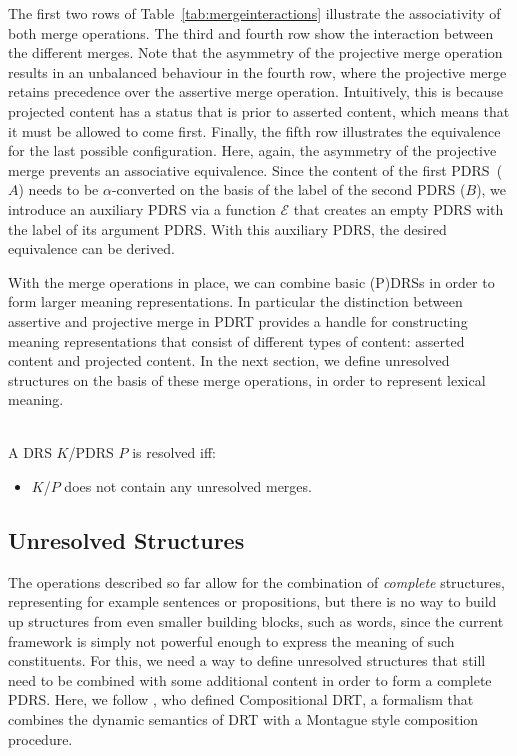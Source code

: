 \noindent The first two rows of Table~\ref{tab:mergeinteractions} illustrate
the associativity of both merge operations. The third and fourth row show
the interaction between the different merges. Note that the asymmetry of the
projective merge operation results in an unbalanced behaviour in the fourth
row, where the projective merge retains precedence over the assertive merge
operation. Intuitively, this is because projected content has a status that
is prior to asserted content, which means that it must be allowed to come
first.  Finally, the fifth row illustrates the equivalence for the last
possible configuration. Here, again, the asymmetry of the projective merge
prevents an associative equivalence. Since the content of the first
PDRS~($A$) needs to be $\alpha$-converted on the basis of the label of the
second PDRS ($B$), we introduce an auxiliary PDRS via a function
$\mathcal{E}$ that creates an empty PDRS with the label of its argument
PDRS. With this auxiliary PDRS, the desired equivalence can be derived.

With the merge operations in place, we can combine basic (P)DRSs in order to
form larger meaning representations. In particular the distinction between
assertive and projective merge in PDRT provides a handle for constructing
meaning representations that consist of different types of content: asserted
content and projected content. In the next section, we define unresolved
structures on the basis of these merge operations, in order to represent
lexical meaning.

\begin{definition}[Resolvedness]~\\
A DRS $K$/PDRS $P$ is resolved iff:
\begin{itemize}
  \item $K$/$P$ does not contain any unresolved merges.
\end{itemize}
\end{definition}

\subsection{Unresolved Structures}

The operations described so far allow for the combination of \emph{complete}
structures, representing for example sentences or propositions, but there is
no way to build up structures from even smaller building blocks, such as
words, since the current framework is simply not powerful enough to express
the meaning of such constituents. For this, we need a way to define
unresolved structures that still need to be combined with some additional
content in order to form a complete PDRS.  Here, we follow
, who defined Compositional DRT,
a formalism that combines the dynamic semantics of DRT with a Montague style
composition procedure.

